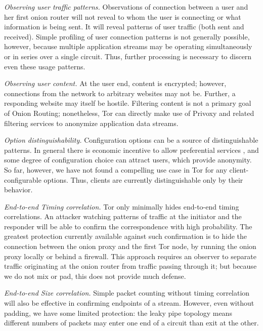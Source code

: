 \documentclass[times,10pt,twocolumn]{article}
\begin{document}
\emph{Observing user traffic patterns.} Observations of connection
between a user and her first onion router will not reveal to whom
the user is connecting or what information is being sent. It will
reveal patterns of user traffic (both sent and received). Simple
profiling of user connection patterns is not generally possible,
however, because multiple application streams may be operating
simultaneously or in series over a single circuit. Thus, further
processing is necessary to discern even these usage patterns.
  
\emph{Observing user content.} At the user end, content is
encrypted; however, connections from the network to arbitrary
websites may not be. Further, a responding website may itself be
hostile. Filtering content is not a primary goal of
Onion Routing; nonetheless, Tor can directly make use of Privoxy and
related filtering services to anonymize application data streams.

\emph{Option distinguishability.} Configuration options can be a
source of distinguishable patterns. In general there is economic
incentive to allow preferential services \cite{econymics}, and some
degree of configuration choice can attract users, which
provide anonymity.  So far, however, we have
not found a compelling use case in Tor for any client-configurable
options.  Thus, clients are currently distinguishable only by their
behavior.
  
\emph{End-to-end Timing correlation.}  Tor only minimally hides
end-to-end timing correlations. An attacker watching patterns of
traffic at the initiator and the responder will be
able to confirm the correspondence with high probability. The
greatest protection currently available against such confirmation is to hide
the connection between the onion proxy and the first Tor node,
by running the onion proxy locally or 
behind a firewall.  This approach
requires an observer to separate traffic originating at the onion
router from traffic passing through it; but because we do not mix
or pad, this does not provide much defense.
  
\emph{End-to-end Size correlation.} Simple packet counting
without timing correlation will also be effective in confirming
endpoints of a stream. However, even without padding, we have some
limited protection: the leaky pipe topology means different numbers
of packets may enter one end of a circuit than exit at the other.
  
\end{document}
